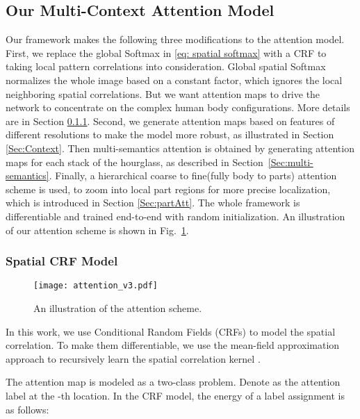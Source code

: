 \documentclass[10pt,twocolumn,letterpaper]{article}
\begin{document}
\subsection{Our Multi-Context Attention Model}
Our framework makes the following three modifications to the attention model. 
First, we replace the global Softmax in \ref{eq: spatial softmax} with a CRF to taking local pattern correlations into consideration.
Global spatial Softmax normalizes the whole image based on a constant factor, which ignores the local neighboring spatial correlations.
But we want attention maps to drive the network to concentrate on the complex human body configurations. 
More details are in Section \ref{Sec:Spatial}.
Second, we generate attention maps based on features of different resolutions to make the model more robust, as illustrated in Section \ref{Sec:Context}. 
Then multi-semantics attention is obtained by generating attention maps for each stack of the hourglass, as described in Section~\ref{Sec:multi-semantics}.
Finally, a hierarchical coarse to fine(\ie fully body to parts) attention scheme is used, to zoom into local part regions for more precise localization, which is introduced in Section \ref{Sec:partAtt}.
The whole framework is differentiable and trained end-to-end with random initialization. An illustration of our attention scheme is shown in Fig.~\ref{fig:attention generation}.
\vspace{-1em}
\subsubsection{Spatial CRF Model}
\label{Sec:Spatial}
\begin{figure}[t]
\begin{center}
   \texttt{[image: attention\_v3.pdf]}
\end{center}
	\vspace{-1.5em}
   \caption{\small An illustration of the attention scheme.}
   	\vspace{-1.5em}
\label{fig:attention generation}
\end{figure}

In this work, we use Conditional Random Fields (CRFs) to model the spatial correlation. 
To make them differentiable, we use the mean-field approximation approach to recursively learn the spatial correlation kernel \cite{zheng2015conditional,krahenbuhl2012efficient}. 

The attention map is modeled as a two-class problem. Denote  as the attention label at the -th location. In the CRF model, the energy of a label assignment  is as follows:
\end{document}
